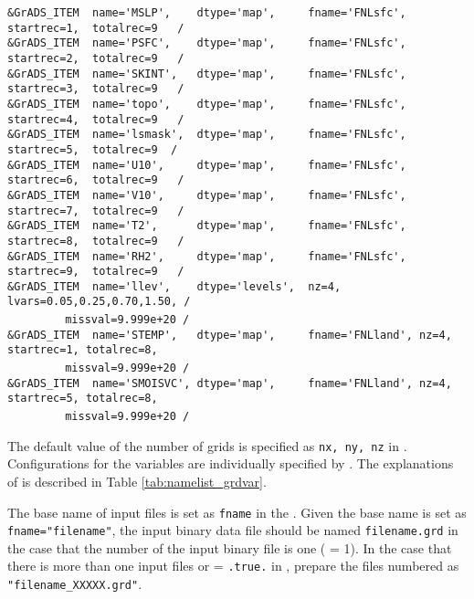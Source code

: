 {\verb|&GrADS_ITEM  name='MSLP',    dtype='map',     fname='FNLsfc', startrec=1,  totalrec=9   / |  \\
\verb|&GrADS_ITEM  name='PSFC',    dtype='map',     fname='FNLsfc', startrec=2,  totalrec=9   / |  \\
\verb|&GrADS_ITEM  name='SKINT',   dtype='map',     fname='FNLsfc', startrec=3,  totalrec=9   / |  \\
\verb|&GrADS_ITEM  name='topo',    dtype='map',     fname='FNLsfc', startrec=4,  totalrec=9   / |  \\
\verb|&GrADS_ITEM  name='lsmask',  dtype='map',     fname='FNLsfc', startrec=5,  totalrec=9  /  |  \\
\verb|&GrADS_ITEM  name='U10',     dtype='map',     fname='FNLsfc', startrec=6,  totalrec=9   / |  \\
\verb|&GrADS_ITEM  name='V10',     dtype='map',     fname='FNLsfc', startrec=7,  totalrec=9   / |  \\
\verb|&GrADS_ITEM  name='T2',      dtype='map',     fname='FNLsfc', startrec=8,  totalrec=9   / |  \\
\verb|&GrADS_ITEM  name='RH2',     dtype='map',     fname='FNLsfc', startrec=9,  totalrec=9   / |  \\
\verb|&GrADS_ITEM  name='llev',    dtype='levels',  nz=4, lvars=0.05,0.25,0.70,1.50, /        |  \\
~~~~~~~~\verb| missval=9.999e+20 /|  \\
\verb|&GrADS_ITEM  name='STEMP',   dtype='map',     fname='FNLland', nz=4, startrec=1, totalrec=8,|\\
~~~~~~~~\verb| missval=9.999e+20 /|  \\
\verb|&GrADS_ITEM  name='SMOISVC', dtype='map',     fname='FNLland', nz=4, startrec=5, totalrec=8,|\\
~~~~~~~~\verb| missval=9.999e+20 /|  \\
}

The default value of the number of grids is specified as \verb|nx, ny, nz| in .
Configurations for the variables are individually specified by .
The explanations of  is described in Table \ref{tab:namelist_grdvar}.

The base name of input files is set as \verb|fname| in the .
Given the base name is set as \verb|fname="filename"|, the input binary data file should be named  \verb|filename.grd| in the case that the number of the input binary file is one ( = 1).
In the case that there is more than one input files or  = \verb|.true.| in , 
prepare the files numbered as \verb|"filename_XXXXX.grd"|.

